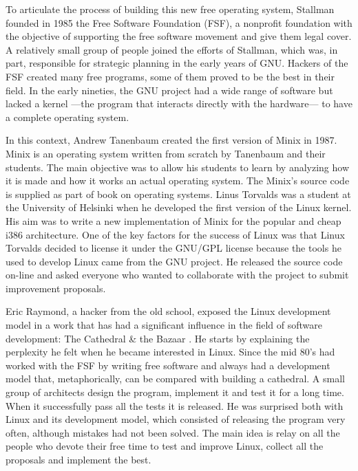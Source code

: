 To articulate the process of building this new free operating system, Stallman founded in 1985 the Free Software Foundation (FSF), a nonprofit foundation with the objective of supporting the free software movement and give them legal cover. A relatively small group of people joined the efforts of Stallman, which was, in part, responsible for strategic planning in the early years of GNU. Hackers of the FSF created many free programs, some of them proved to be the best in their field. In the early nineties, the GNU project had a wide range of software but lacked a kernel ---the program that interacts directly with the hardware--- to have a complete operating system.

In this context, Andrew Tanenbaum created the first version of Minix in 1987. Minix is an operating system written from scratch by Tanenbaum and their students. The main objective was to allow his students to learn by analyzing how it is made and how it works an actual operating system. The Minix's source code is supplied as part of \citet{tanenbaum:1996} book on operating systems. Linus Torvalds was a student at the University of Helsinki when he developed the first version of the Linux kernel. His aim was to write a new implementation of Minix for the popular and cheap i386 architecture. One of the key factors for the success of Linux was that Linux Torvalds decided to license it under the GNU/GPL license because the tools he used to develop Linux came from the GNU project. He released the source code on-line and asked everyone who wanted to collaborate with the project to submit improvement proposals.

Eric Raymond, a hacker from the old school, exposed the Linux development model in a work that has had a significant influence in the field of software development: The Cathedral \& the Bazaar \citep{raymond:1999}. He starts by explaining the perplexity he felt when he became interested in Linux. Since the mid 80's had worked with the FSF by writing free software and always had a development model that, metaphorically, can be compared with building a cathedral. A small group of architects design the program, implement it and test it for a long time. When it successfully pass all the tests it is released. He was surprised both with Linux and its development model, which consisted of releasing the program very often, although mistakes had not been solved. The main idea is relay on all the people who devote their free time to test and improve Linux, collect all the proposals and implement the best.

